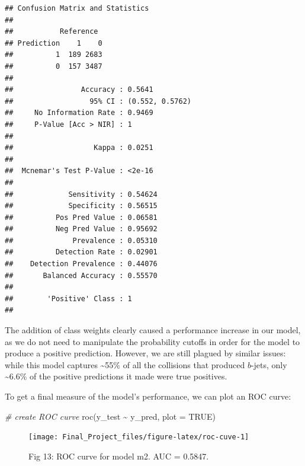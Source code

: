 \documentclass[
]{article}
\newenvironment{Shaded}{\begin{snugshade}}{\end{snugshade}}
\newcommand{\AttributeTok}[1]{\textcolor[rgb]{0.77,0.63,0.00}{#1}}
\newcommand{\CommentTok}[1]{\textcolor[rgb]{0.56,0.35,0.01}{\textit{#1}}}
\newcommand{\ConstantTok}[1]{\textcolor[rgb]{0.00,0.00,0.00}{#1}}
\newcommand{\FunctionTok}[1]{\textcolor[rgb]{0.00,0.00,0.00}{#1}}
\newcommand{\NormalTok}[1]{#1}
\newcommand{\SpecialCharTok}[1]{\textcolor[rgb]{0.00,0.00,0.00}{#1}}
\begin{document}
\begin{verbatim}
## Confusion Matrix and Statistics
## 
##           Reference
## Prediction    1    0
##          1  189 2683
##          0  157 3487
##                                          
##                Accuracy : 0.5641         
##                  95% CI : (0.552, 0.5762)
##     No Information Rate : 0.9469         
##     P-Value [Acc > NIR] : 1              
##                                          
##                   Kappa : 0.0251         
##                                          
##  Mcnemar's Test P-Value : <2e-16         
##                                          
##             Sensitivity : 0.54624        
##             Specificity : 0.56515        
##          Pos Pred Value : 0.06581        
##          Neg Pred Value : 0.95692        
##              Prevalence : 0.05310        
##          Detection Rate : 0.02901        
##    Detection Prevalence : 0.44076        
##       Balanced Accuracy : 0.55570        
##                                          
##        'Positive' Class : 1              
## 
\end{verbatim}

The addition of class weights clearly caused a performance increase in
our model, as we do not need to manipulate the probability cutoffs in
order for the model to produce a positive prediction. However, we are
still plagued by similar issues: while this model captures
\textasciitilde55\% of all the collisions that produced \(b\)-jets, only
\textasciitilde6.6\% of the positive predictions it made were true
positives.

To get a final measure of the model's performance, we can plot an ROC
curve:

\begin{Shaded}
\begin{Highlighting}[]
\CommentTok{\# create ROC curve}
\FunctionTok{roc}\NormalTok{(y\_test }\SpecialCharTok{\textasciitilde{}}\NormalTok{ y\_pred, }\AttributeTok{plot =} \ConstantTok{TRUE}\NormalTok{)}
\end{Highlighting}
\end{Shaded}

\begin{figure}

{\centering \texttt{[image: Final\_Project\_files/figure-latex/roc-cuve-1]} 

}

\caption{Fig 13: ROC curve for model m2. AUC = 0.5847.}\label{fig:roc-cuve}
\end{figure}
\end{document}
